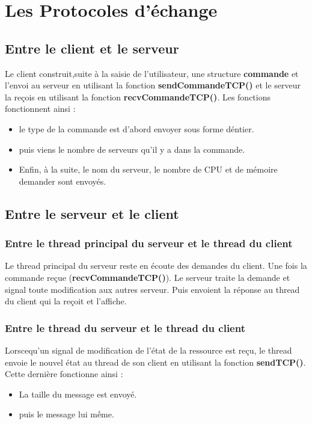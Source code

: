 \documentclass[oneside,13pt,a4paper]{article}
\begin{document}
\section{Les Protocoles d'échange}

\subsection{Entre le client et le serveur}

Le client construit,suite à la saisie de l'utilisateur, une structure \textbf{commande} et l'envoi au serveur en utilisant la fonction \textbf{sendCommandeTCP()} et le serveur la reçois en utilisant la fonction \textbf{recvCommandeTCP()}. Les fonctions fonctionnent ainsi :
\begin{itemize}
	\item le type de la commande est d'abord envoyer sous forme d\'entier.
	\item puis viens le nombre de serveurs qu'il y a dans la commande.
	\item Enfin, à la suite, le nom du serveur, le nombre de CPU et de mémoire demander sont envoyés.
\end{itemize}

\subsection{Entre le serveur et le client}

\subsubsection{Entre le thread principal du serveur et le thread du client}

Le thread principal du serveur reste en écoute des demandes du client. Une fois la commande reçue (\textbf{recvCommandeTCP()}). Le serveur traite la demande et signal toute modification aux autres serveur. Puis envoient la réponse au thread du client qui la reçoit et l'affiche.

\subsubsection{Entre le thread du serveur et le thread du client}

Lorscequ'un signal de modification de l'état de la ressource est reçu, le thread envoie le nouvel état au thread de son client en utilisant la fonction \textbf{sendTCP()}. Cette dernière fonctionne ainsi :
\begin{itemize}
	\item La taille du message est envoyé.
	\item puis le message lui mếme.
\end{itemize}
\end{document}
